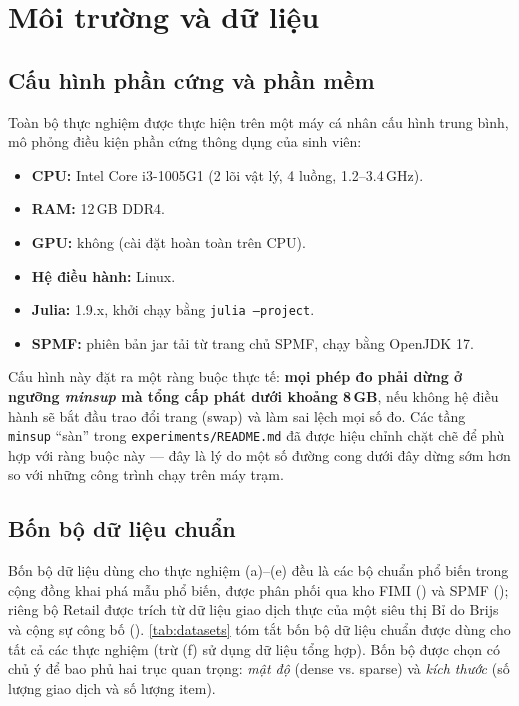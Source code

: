 \section{Môi trường và dữ liệu}
\label{sec:exp-env}

\subsection{Cấu hình phần cứng và phần mềm}

Toàn bộ thực nghiệm được thực hiện trên một máy cá nhân cấu hình trung bình, mô phỏng điều kiện phần cứng thông dụng của sinh viên:

\begin{itemize}
    \item \textbf{CPU:} Intel Core i3-1005G1 (2 lõi vật lý, 4 luồng, 1.2--3.4\,GHz).
    \item \textbf{RAM:} 12\,GB DDR4.
    \item \textbf{GPU:} không (cài đặt hoàn toàn trên CPU).
    \item \textbf{Hệ điều hành:} Linux.
    \item \textbf{Julia:} 1.9.x, khởi chạy bằng \texttt{julia --project}.
    \item \textbf{SPMF:} phiên bản jar tải từ trang chủ SPMF, chạy bằng OpenJDK 17.
\end{itemize}

Cấu hình này đặt ra một ràng buộc thực tế: \textbf{mọi phép đo phải dừng ở ngưỡng \textit{minsup} mà tổng cấp phát dưới khoảng 8\,GB}, nếu không hệ điều hành sẽ bắt đầu trao đổi trang (swap) và làm sai lệch mọi số đo. Các tầng \texttt{minsup} ``sàn'' trong \texttt{experiments/README.md} đã được hiệu chỉnh chặt chẽ để phù hợp với ràng buộc này --- đây là lý do một số đường cong dưới đây dừng sớm hơn so với những công trình chạy trên máy trạm.

\subsection{Bốn bộ dữ liệu chuẩn}

Bốn bộ dữ liệu dùng cho thực nghiệm (a)--(e) đều là các bộ chuẩn phổ biến trong cộng đồng khai phá mẫu phổ biến, được phân phối qua kho FIMI (\cite{Goethals2003FIMI}) và SPMF (\cite{FournierViger2014SPMF}); riêng bộ Retail được trích từ dữ liệu giao dịch thực của một siêu thị Bỉ do Brijs và cộng sự công bố (\cite{BrijsRetail1999}). \autoref{tab:datasets} tóm tắt bốn bộ dữ liệu chuẩn được dùng cho tất cả các thực nghiệm (trừ (f) sử dụng dữ liệu tổng hợp). Bốn bộ được chọn có chủ ý để bao phủ hai trục quan trọng: \emph{mật độ} (dense vs. sparse) và \emph{kích thước} (số lượng giao dịch và số lượng item).

